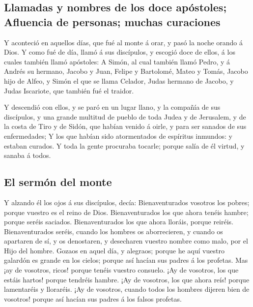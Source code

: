 \hypertarget{llamadas-y-nombres-de-los-doce-apuxf3stoles-afluencia-de-personas-muchas-curaciones}{%
\subsection{Llamadas y nombres de los doce apóstoles; Afluencia de
personas; muchas
curaciones}\label{llamadas-y-nombres-de-los-doce-apuxf3stoles-afluencia-de-personas-muchas-curaciones}}

 Y aconteció en aquellos días, que fué al monte á orar, y
pasó la noche orando á Dios.  Y como fué de día, llamó á
sus discípulos, y escogió doce de ellos, á los cuales también llamó
apóstoles:  A Simón, al cual también llamó Pedro, y á
Andrés su hermano, Jacobo y Juan, Felipe y Bartolomé, 
Mateo y Tomás, Jacobo hijo de Alfeo, y Simón el que se llama Celador,
 Judas hermano de Jacobo, y Judas Iscariote, que también
fué el traidor.

 Y descendió con ellos, y se paró en un lugar llano, y la
compañía de sus discípulos, y una grande multitud de pueblo de toda
Judea y de Jerusalem, y de la costa de Tiro y de Sidón, que habían
venido á oirle, y para ser sanados de sus enfermedades; 
Y los que habían sido atormentados de espíritus inmundos: y estaban
curados.  Y toda la gente procuraba tocarle; porque salía
de él virtud, y sanaba á todos.

\hypertarget{el-sermuxf3n-del-monte}{%
\subsection{El sermón del monte}\label{el-sermuxf3n-del-monte}}

 Y alzando él los ojos á sus discípulos, decía:
Bienaventurados vosotros los pobres; porque vuestro es el reino de Dios.
 Bienaventurados los que ahora tenéis hambre; porque
seréis saciados. Bienaventurados los que ahora lloráis, porque reiréis.
 Bienaventurados seréis, cuando los hombres os
aborrecieren, y cuando os apartaren de sí, y os denostaren, y desecharen
vuestro nombre como malo, por el Hijo del hombre.  Gozaos
en aquel día, y alegraos; porque he aquí vuestro galardón es grande en
los cielos; porque así hacían sus padres á los profetas. 
Mas ¡ay de vosotros, ricos! porque tenéis vuestro consuelo.
 ¡Ay de vosotros, los que estáis hartos! porque tendréis
hambre. ¡Ay de vosotros, los que ahora reís! porque lamentaréis y
lloraréis.  ¡Ay de vosotros, cuando todos los hombres
dijeren bien de vosotros! porque así hacían sus padres á los falsos
profetas.


